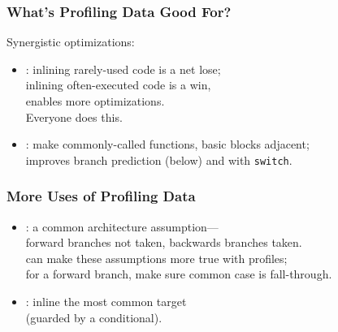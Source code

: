 \documentclass[aspectratio=43]{beamer}
\newenvironment{changemargin}[1]{%
  \begin{list}{}{%
    \setlength{\topsep}{0pt}%
    \setlength{\leftmargin}{#1}%
    \setlength{\rightmargin}{1em}
    \setlength{\listparindent}{\parindent}%
    \setlength{\itemindent}{\parindent}%
    \setlength{\parsep}{\parskip}%
  }%
  \item[]}{\end{list}}
\begin{document}
\begin{frame}
  \frametitle{What's Profiling Data Good For?}
  \begin{changemargin}{2cm}
Synergistic optimizations:
\begin{itemize}
\item {}: inlining rarely-used code is a net lose; \\
inlining often-executed code is a win, \\
\qquad enables more optimizations.\\[1em]
Everyone does this.\\[1em]

\item {}: make commonly-called functions, basic blocks adjacent;\\
improves branch prediction (below) and with {\tt switch}.

\end{itemize}


  \end{changemargin}

\end{frame}


\begin{frame}
  \frametitle{More Uses of Profiling Data}
  \begin{changemargin}{1cm}

\begin{itemize}
\item {}: a common architecture assumption---\\
\qquad forward branches not taken, backwards branches taken.\\
can make these assumptions more true with profiles;\\
for a forward branch, make sure common case is fall-through.\\[1em]

\item {}: inline the most common target \\ \qquad (guarded by a conditional).
\end{itemize}
  \end{changemargin}

\end{frame}
\end{document}
